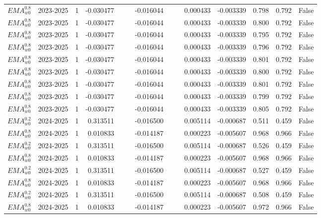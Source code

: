 \begin{tabular}{@{}llrrrrrrrrrlll@{}}
$EMA^{0.8}_{w0}$ & 2023-2025 & 1 & -0.030477 &  &  & -0.016044 &  &  & 0.000433 & -0.003339 & 0.798 & 0.792 & False \\
$EMA^{0.8}_{w0}$ & 2023-2025 & 1 & -0.030477 &  &  & -0.016044 &  &  & 0.000433 & -0.003339 & 0.800 & 0.792 & False \\
$EMA^{0.8}_{w0}$ & 2023-2025 & 1 & -0.030477 &  &  & -0.016044 &  &  & 0.000433 & -0.003339 & 0.795 & 0.792 & False \\
$EMA^{0.8}_{w0}$ & 2023-2025 & 1 & -0.030477 &  &  & -0.016044 &  &  & 0.000433 & -0.003339 & 0.796 & 0.792 & False \\
$EMA^{0.8}_{w0}$ & 2023-2025 & 1 & -0.030477 &  &  & -0.016044 &  &  & 0.000433 & -0.003339 & 0.801 & 0.792 & False \\
$EMA^{0.8}_{w0}$ & 2023-2025 & 1 & -0.030477 &  &  & -0.016044 &  &  & 0.000433 & -0.003339 & 0.800 & 0.792 & False \\
$EMA^{0.8}_{w0}$ & 2023-2025 & 1 & -0.030477 &  &  & -0.016044 &  &  & 0.000433 & -0.003339 & 0.801 & 0.792 & False \\
$EMA^{0.8}_{w0}$ & 2023-2025 & 1 & -0.030477 &  &  & -0.016044 &  &  & 0.000433 & -0.003339 & 0.799 & 0.792 & False \\
$EMA^{0.8}_{w0}$ & 2023-2025 & 1 & -0.030477 &  &  & -0.016044 &  &  & 0.000433 & -0.003339 & 0.805 & 0.792 & False \\
$EMA^{0.2}_{w0}$ & 2024-2025 & 1 & 0.313511 &  &  & -0.016500 &  &  & 0.005114 & -0.000687 & 0.511 & 0.459 & False \\
$EMA^{0.8}_{w0}$ & 2024-2025 & 1 & 0.010833 &  &  & -0.014187 &  &  & 0.000223 & -0.005607 & 0.968 & 0.966 & False \\
$EMA^{0.2}_{w0}$ & 2024-2025 & 1 & 0.313511 &  &  & -0.016500 &  &  & 0.005114 & -0.000687 & 0.526 & 0.459 & False \\
$EMA^{0.8}_{w0}$ & 2024-2025 & 1 & 0.010833 &  &  & -0.014187 &  &  & 0.000223 & -0.005607 & 0.968 & 0.966 & False \\
$EMA^{0.2}_{w0}$ & 2024-2025 & 1 & 0.313511 &  &  & -0.016500 &  &  & 0.005114 & -0.000687 & 0.527 & 0.459 & False \\
$EMA^{0.8}_{w0}$ & 2024-2025 & 1 & 0.010833 &  &  & -0.014187 &  &  & 0.000223 & -0.005607 & 0.968 & 0.966 & False \\
$EMA^{0.2}_{w0}$ & 2024-2025 & 1 & 0.313511 &  &  & -0.016500 &  &  & 0.005114 & -0.000687 & 0.508 & 0.459 & False \\
$EMA^{0.8}_{w0}$ & 2024-2025 & 1 & 0.010833 &  &  & -0.014187 &  &  & 0.000223 & -0.005607 & 0.972 & 0.966 & False \\

\end{tabular}

